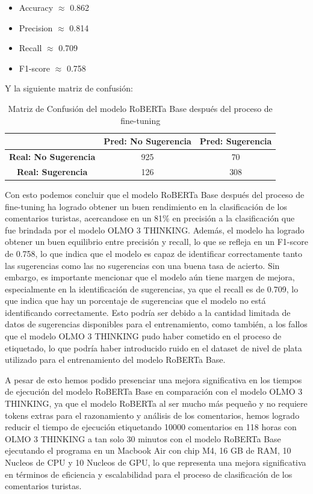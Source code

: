 \begin{itemize}
    \item Accuracy $\approx$ 0.862
    \item Precision $\approx$ 0.814
    \item Recall $\approx$ 0.709
    \item F1-score $\approx$ 0.758
\end{itemize}

Y la siguiente matriz de confusión:

\begin{table}[H]
\centering
\begin{tabular}{|c|c|c|}
\hline
\textbf{} & \textbf{Pred: No Sugerencia} & \textbf{Pred: Sugerencia} \\ \hline
\textbf{Real: No Sugerencia} & 925 & 70 \\ \hline
\textbf{Real: Sugerencia} & 126 & 308 \\ \hline
\end{tabular}
\caption{Matriz de Confusión del modelo RoBERTa Base después del proceso de fine-tuning}
\label{tab:matriz_confusion_roberta}
\end{table}

Con esto podemos concluir que el modelo RoBERTa Base después del proceso de fine-tuning ha logrado obtener un buen rendimiento en la clasificación de los comentarios turistas, acercandose en un 81\% en precisión a la clasificación que fue brindada por el modelo OLMO 3 THINKING. Además, el modelo ha logrado obtener un buen equilibrio entre precisión y recall, lo que se refleja en un F1-score de 0.758, lo que indica que el modelo es capaz de identificar correctamente tanto las sugerencias como las no sugerencias con una buena tasa de acierto. Sin embargo, es importante mencionar que el modelo aún tiene margen de mejora, especialmente en la identificación de sugerencias, ya que el recall es de 0.709, lo que indica que hay un porcentaje de sugerencias que el modelo no está identificando correctamente. Esto podría ser debido a la cantidad limitada de datos de sugerencias disponibles para el entrenamiento, como también, a los fallos que el modelo OLMO 3 THINKING pudo haber cometido en el proceso de etiquetado, lo que podría haber introducido ruido en el dataset de nivel de plata utilizado para el entrenamiento del modelo RoBERTa Base. 

A pesar de esto hemos podido presenciar una mejora significativa en los tiempos de ejecución del modelo RoBERTa Base en comparación con el modelo OLMO 3 THINKING, ya que el modelo RoBERTa al ser mucho más pequeño y no requiere tokens extras para el razonamiento y análisis de los comentarios, hemos logrado reducir el tiempo de ejecución etiquetando 10000 comentarios en 118 horas con OLMO 3 THINKING a tan solo 30 minutos con el modelo RoBERTa Base ejecutando el programa en un Macbook Air con chip M4, 16 GB de RAM, 10 Nucleos de CPU y 10 Nucleos de GPU, lo que representa una mejora significativa en términos de eficiencia y escalabilidad para el proceso de clasificación de los comentarios turistas.